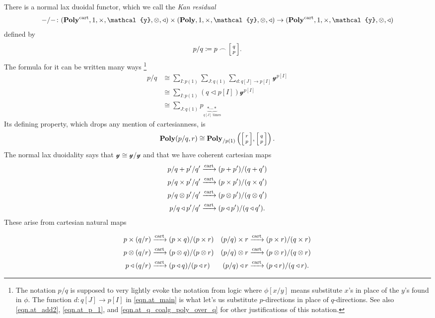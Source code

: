\documentclass[11pt, one side, article]{memoir}
\makeatletter
\theoremstyle{definition}
\theoremstyle{plain}
\newcommand{\Cat}[1]{\mathbf{#1}}%
\newcommand{\To}[2][]{\xrightarrow[#1]{\tn{$#2$}}}
\newcommand{\tn}[1]{\textnormal{#1}}
\newcommand{\yon}{{\mathcal{y}}}
\newcommand{\poly}{\Cat{Poly}}
\newcommand{\cart}{\tn{cart}}
\newcommand{\tocart}{\To{\cart}}
\newcommand{\polycart}{\poly^\cart}
\newcommand{\0}{\textsf{0}}
\newcommand{\1}{\tn{\textsf{1}}}
\newcommand{\tri}{\mathbin{\triangleleft}}
\newcommand{\at}[2]{#1/#2}
\newcommand{\biglens}[2]{
     \begin{bmatrix}{\vphantom{f_f^f}#2} \\ {\vphantom{f_f^f}#1} \end{bmatrix}
}
\newcommand{\littlelens}[2]{
     \begin{bsmallmatrix}{\vphantom{f}#2} \\ {\vphantom{f}#1} \end{bsmallmatrix}
}
\newcommand{\lens}[2]{
  \relax\if@display
     \biglens{#1}{#2}
  \else
     \littlelens{#1}{#2}
  \fi
}
\makeatother
\begin{document}
There is a normal lax duoidal functor, which we call the \emph{Kan residual}
\begin{equation}
	\at{-}{-}\colon(\polycart,1,\times,\yon,\otimes,\tri)\times(\poly,1,\times,\yon,\otimes,\tri)\to(\polycart,1,\times,\yon,\otimes,\tri)
\end{equation}
defined by
\begin{equation}
		\at{p}{q}\coloneqq p\frown\lens{p}{q}.
\end{equation}
The formula for it can be written many ways%
\footnote{The notation $\at{p}{q}$ is supposed to very lightly evoke the notation from logic where $\phi[x/y]$ means substitute $x$'s in place of the $y$'s found in $\phi$. The function $d\colon q[J]\to p[I]$ in \eqref{eqn.at_main} is what let's us substitute $p$-directions in place of $q$-directions. See also \eqref{eqn.at_add2}, \eqref{eqn.at_p_1}, and \eqref{eqn.at_q_coalg_poly_over_q} for other justifications of this notation.}
\begin{align}
	\at{p}{q}&\cong\label{eqn.at_main}
	\sum_{I:p(1)}\sum_{J:q(1)}\sum_{d\colon q[J]\to p[I]}\yon^{p[I]}\\&\cong
	\sum_{I:p(1)}(q\tri p[I])\yon^{p[I]}\\&\cong
	\sum_{J:q(1)}p_{\underbrace{*\cdots*}_{q[J]\text{ times}}}
\end{align}
Its defining property, which drops any mention of cartesianness, is
\begin{equation}
	\poly(\at{p}{q}, r)\cong\poly_{/p(1)}\left(\lens{p}{r},\lens{p}{q}\right).
\end{equation}
The normal lax duoidality says that $\yon\cong\at{\yon}{\yon}$ and that we have coherent cartesian maps
\begin{align}
\label{eqn.atplus}
	\at{p}{q}+\at{p'}{q'}&\tocart\at{(p+p')}{(q+ q')}\\
\label{eqn.attimes}
	\at{p}{q}\times\at{p'}{q'}&\tocart\at{(p\times p')}{(q\times q')}\\
\label{eqn.atotimes}
	\at{p}{q}\otimes\at{p'}{q'}&\tocart\at{(p\otimes p')}{( q\otimes q')}\\
\label{eqn.attri}
	\at{p}{q}\tri\at{p'}{q'}&\tocart\at{(p\tri p')}{( q\tri q')}.
\end{align}
These arise from cartesian natural maps%

\begin{align}
  p\times(\at{q}{r})&\tocart \at{(p\times q)}{(p\times r)}&
	(\at{p}{q})\times r&\tocart \at{(p\times r)}{(q\times r)}\\  
	p\otimes(\at{q}{r})&\tocart \at{(p\otimes q)}{(p\otimes r)}&
	(\at{p}{q})\otimes r&\tocart \at{(p\otimes r)}{(q\otimes r)}\\
  p\tri(\at{q}{r})&\tocart \at{(p\tri q)}{(p\tri r)}&
	(\at{p}{q})\tri r&\tocart \at{(p\tri r)}{(q\tri r)}.
\end{align}
\end{document}
